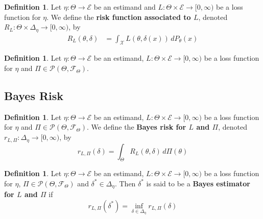 \documentclass[12pt]{amsart}
\theoremstyle{definition}
\newtheorem{defn}[definition]{Definition}
\newcommand{\del}{\delta}
\newcommand{\Del}{\Delta}
\newcommand{\MF}{\mathcal{F}}
\newcommand{\MP}{\mathcal{P}}
\newcommand{\ME}{\mathcal{E}}
\newcommand{\MX}{\mathcal{X}}
\newcommand{\Rg}{[0,\infty)}
\newcommand{\dP}{\, d P}
\begin{document}
	\begin{defn}
		Let $\eta: \Theta \rightarrow \ME$ be an estimand and $L: \Theta \times \ME \rightarrow \Rg$ be a loss function for $\eta$. We define the \textbf{risk function associated to $L$}, denoted $R_L: \Theta \times \Del_{\eta} \rightarrow \Rg$, by 
		\begin{align*}
			R_L(\theta, \del) 
			& = \int_{\MX} L(\theta, \del(x)) \dP_{\theta}(x)
		\end{align*}
	\end{defn}
	
	\begin{defn}
		Let $\eta: \Theta \rightarrow \ME$ be an estimand, $L: \Theta \times \ME \rightarrow \Rg$ be a loss function for $\eta$ and $\Pi \in \MP(\Theta, \MF_{\Theta})$. 
	\end{defn}
	
	
	
	
	
	
	
	
	
	
	
	
	
	
	
	
	
	
	
	
	
	
	
	
	
	
	
	
	
	
	
	
	
	
	
	
	
	
	
	
	
	
	
	
	\subsection{Bayes Risk}
	
	\begin{defn}
		Let $\eta: \Theta \rightarrow \ME$ be an estimand, $L: \Theta \times \ME \rightarrow \Rg$ be a loss function for $\eta$ and $\Pi \in \MP(\Theta, \MF_{\Theta})$. We define the \textbf{Bayes risk for $L$ and $\Pi$}, denoted $r_{L, \Pi}: \Del_{\eta} \rightarrow \Rg$, by 
		$$r_{L, \Pi}(\del) = \int_{\Theta} R_L(\theta, \del) \, d \Pi(\theta)$$
	\end{defn}

	\begin{defn}
		Let $\eta: \Theta \rightarrow \ME$ be an estimand, $L: \Theta \times \ME \rightarrow \Rg$ be a loss function for $\eta$, $\Pi \in \MP(\Theta, \MF_{\Theta})$ and $\del^* \in \Del_{\eta}$. Then $\del^*$ is said to be a \textbf{Bayes estimator for $L$ and $\Pi$} if 
		$$r_{L, \Pi}(\del^*) = \inf_{\del \in \Del_{\eta}}r_{L, \Pi}(\del)$$
	\end{defn}
	
\end{document}
